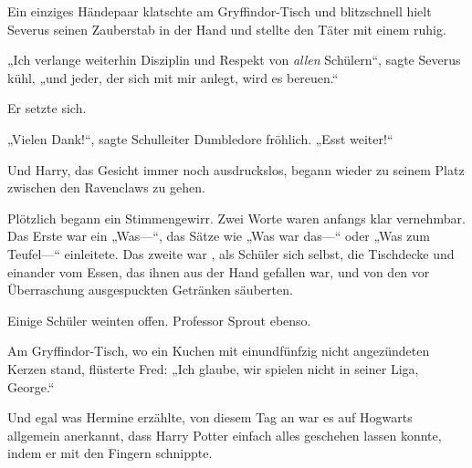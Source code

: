 Ein einziges Händepaar klatschte am Gryffindor-Tisch und blitzschnell hielt Severus seinen Zauberstab in der Hand und stellte den Täter mit einem  ruhig.

„Ich verlange weiterhin Disziplin und Respekt von \emph{allen} Schülern“, sagte Severus kühl, „und jeder, der sich mit mir anlegt, wird es bereuen.“

Er setzte sich.

„Vielen Dank!“, sagte Schulleiter Dumbledore fröhlich. „Esst weiter!“

Und Harry, das Gesicht immer noch ausdruckslos, begann wieder zu seinem Platz zwischen den Ravenclaws zu gehen.

Plötzlich begann ein Stimmengewirr. Zwei Worte waren anfangs klar vernehmbar. Das Erste war ein „Was—“, das Sätze wie „Was war das—“ oder „Was zum Teufel—“ einleitete. Das zweite war , als Schüler sich selbst, die Tischdecke und einander vom Essen, das ihnen aus der Hand gefallen war, und von den vor Überraschung ausgespuckten Getränken säuberten.

Einige Schüler weinten offen. Professor Sprout ebenso.

Am Gryffindor-Tisch, wo ein Kuchen mit einundfünfzig nicht angezündeten Kerzen stand, flüsterte Fred: „Ich glaube, wir spielen nicht in seiner Liga, George.“%

Und egal was Hermine erzählte, von diesem Tag an war es auf Hogwarts allgemein anerkannt, dass Harry Potter einfach alles geschehen lassen konnte, indem er mit den Fingern schnippte.

